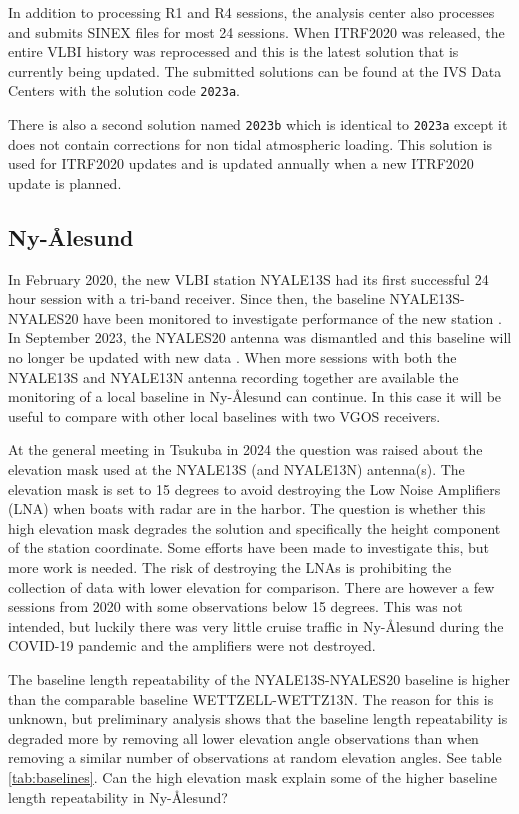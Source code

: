 \documentclass[twocolumn,twoside]{svmultivs_br} %
\begin{document}
In addition to processing R1 and R4 sessions, the analysis center also processes and submits SINEX files for 
most 24 sessions. When ITRF2020 was released, the entire VLBI history was reprocessed and this is the latest solution
that is currently being updated. The submitted solutions can be found at the IVS
Data Centers with the solution code \texttt{2023a}.

There is also a second solution named \texttt{2023b} which
is identical to \texttt{2023a} except it does not contain corrections for non tidal atmospheric loading. This solution
is used for ITRF2020 updates and is updated annually when a new ITRF2020 update is planned. 

\subsection{Ny-\AA lesund}
In February 2020, the new VLBI station NYALE13S had its first successful 24 hour session with a tri-band receiver. 
Since then, the baseline NYALE13S-NYALES20 have been monitored to investigate performance of the new station 
\cite{biennial-acnma2021}. In September 2023, the NYALES20 antenna was dismantled and this baseline will no longer 
be updated with new data \cite{biennial-stanma2023}. When more sessions with both the NYALE13S and NYALE13N antenna
recording together are available the monitoring of a local baseline in Ny-Ålesund can continue. In this case it will be useful to 
compare with other local baselines with two VGOS receivers.

At the general meeting in Tsukuba in 2024 the question was raised about the elevation mask
used at the NYALE13S (and NYALE13N) antenna(s). The elevation mask is set to 15 degrees to avoid destroying the Low Noise
Amplifiers (LNA) when boats with radar are in the harbor. The question is whether this high elevation mask degrades 
the solution and specifically the height component of the station coordinate. Some efforts have been made to investigate this, 
but more work is needed. The risk of destroying the LNAs is prohibiting the collection of data with lower elevation for comparison. 
There are however a few sessions from 2020 with some observations below 15 degrees. This was not intended, but luckily 
there was very little cruise traffic in Ny-\AA lesund during the COVID-19 pandemic and the amplifiers were not destroyed.

The baseline length repeatability of the NYALE13S-NYALES20 baseline is higher than the comparable baseline WETTZELL-WETTZ13N.
The reason for this is unknown, but preliminary analysis shows that the baseline length repeatability is degraded more by
removing all lower elevation angle observations than when removing a similar number of observations at random elevation angles.
See table \ref{tab:baselines}. Can the high elevation mask explain some of the higher baseline length repeatability in Ny-\AA lesund?
\end{document}

